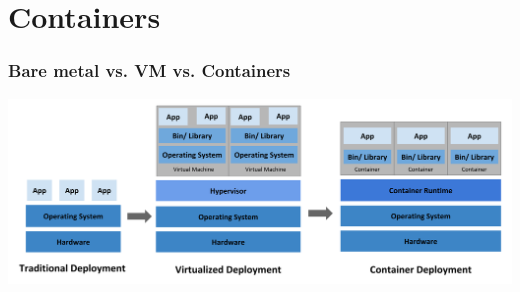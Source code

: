 \documentclass[presentation]{beamer}\mode<presentation>{\usetheme{AMSBolognaFC}}
\begin{document}
\section{Containers}

\begin{frame}
    \frametitle{Bare metal vs. VM vs. Containers}

    \begin{center}
        \includegraphics[width=\linewidth]{figures/vm-vs-containers.png}
    \end{center}

\end{frame}
\end{document}
